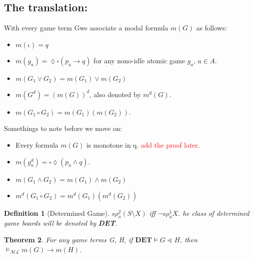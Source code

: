 \documentclass[10pt]{article}
\newcommand{\move}{\lozenge}
\newcommand{\Move}{\square}
\newcommand{\ml}{\mathcal{ML}}
\newcommand{\id}{\iota}
\newcommand{\cle}{\preccurlyeq}
\newtheorem{theorem}{Theorem}
\newtheorem{definition}[theorem]{Definition}
\begin{document}
		\subsection{The translation:}
		With every game term Gwe associate a modal formula $m(G)$ as follows:
		\begin{itemize}
			\item $m(\id) = q$
			\item $m(g_a) = \move\Move(p_a \rightarrow q)$ for any nono-idle atomic game $g_a$, $a\in A$. 
			\item $m(G_1 \lor G_2) = m(G_1)\lor m(G_2)$
			\item $m(G^d) = (m(G))^d$, also denoted by $m^d(G)$.
			\item $m(G_1 \circ G_2) = m(G_1)(m(G_2))$. 
		\end{itemize}
		Somethings to note before we move on:
		\begin{itemize}
			\item Every formula $m(G)$ is  monotone in q. \textcolor{red}{add the proof later}.
			\item $m(g_a^d) = \Move\move(p_a \land q)$.
			\item $m(G_1 \land G_2) = m(G_1) \land m(G_2)$
			\item $m^d(G_1 \circ G_2) = m^d(G_1)(m^d(G_2))$
		\end{itemize}
		\begin{definition}[Determined Game]
			$s\rho_a^2(S\setminus X)$ iff $\neg s \rho_a^1 X$. he class of determined
			game boards will be denoted by \textbf{DET}.
		\end{definition}
		\begin{theorem}\label{eq23}
			For any game terms G, H, if $\textbf{DET}\models G \cle H$, then $\models_{\ml} m(G) \rightarrow m(H)$.
		\end{theorem}
\end{document}
